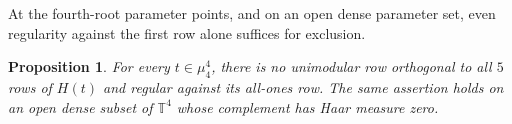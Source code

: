 \documentclass[11pt,a4paper]{article}
\newtheorem{proposition}[theorem]{Proposition}
\theoremstyle{plain}
\theoremstyle{definition}
\theoremstyle{plain}
\begin{document}
\medskip
At the fourth-root parameter points, and on an open dense parameter set, even regularity against the first row alone suffices for exclusion.

\par\addvspace{\medskipamount}\noindent
\begin{minipage}{\linewidth}
\begin{proposition}\label{n11_full:onesided}
For every $t\in\mu_4^4$, there is no unimodular row orthogonal to all $5$ rows of $H(t)$ and regular against its all-ones row. The same assertion holds on an open dense subset of $\mathbb T^4$ whose complement has Haar measure zero.
\end{proposition}
\end{minipage}
\par\addvspace{\medskipamount}
\end{document}
